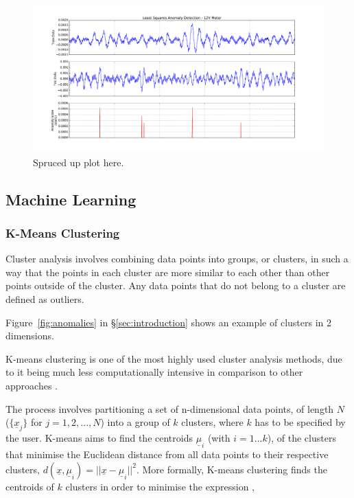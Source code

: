 \begin{figure}[t]
    \includegraphics[width=1.0\textwidth]{fig/lsanomaly.pdf}
    \caption[Least Squares Anomaly Score]{Spruced up plot here.}
    \label{fig:lsanomaly}
\end{figure}

\subsection{Machine Learning}  

\subsubsection{K-Means Clustering}
\label{subsec:kmeans}

Cluster analysis involves combining data points into groups, or clusters, in such a way that the points in each cluster are more similar to each other than other points outside of the cluster. Any data points that do not belong to a cluster are defined as outliers. 

Figure~\ref{fig:anomalies} in \S \ref{sec:introduction} shows an example of clusters in 2 dimensions. 

K-means clustering is one of the most highly used cluster analysis methods, due to it being much less computationally intensive in comparison to other approaches \cite{Kanungo:2002:EKC:628329.628801}.

The process involves partitioning a set of n-dimensional data points, of length $N$ ($\{\underline{x}_j\}$ for $j=1,2,...,N$) into a group of $k$ clusters, where $k$ has to be specified by the user. K-means aims to find the centroids $\underline{\mu}_i$ (with $i=1...k$), of the clusters that minimise the Euclidean distance from all data points to their respective clusters, $d(\underline{x}, \underline{\mu}_i) = ||\underline{x}-\underline{\mu}_i||^2$. More formally, K-means clustering finds the centroids of $k$ clusters in order to minimise the expression \cite{596afe3f2b5a4ff3b8f4f9793ad2f4ee},

